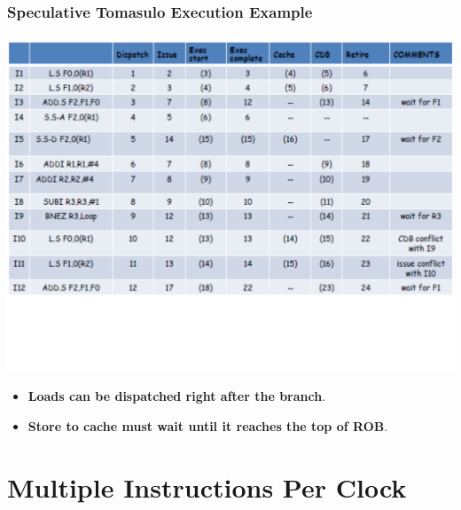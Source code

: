 \documentclass{beamer}
\newcommand{\emp}[1]{\textcolor{DikuRed}{ #1}}
\begin{document}
\begin{frame}[fragile,t]
\frametitle{Speculative Tomasulo Execution Example}

\includegraphics[width=67ex]{FigsOoOProc/SpecTomasuloEg.pdf}
\vspace{-11ex}

\begin{itemize}
    \item \emp{\bf Loads can be dispatched right after the branch}.
    \item \emp{\bf Store to cache must wait until it reaches the top of ROB}.
\end{itemize}
\end{frame}



\section{Multiple Instructions Per Clock}
\end{document}
